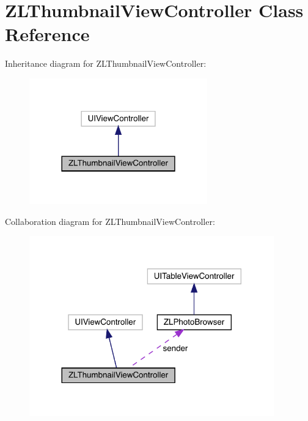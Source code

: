 \hypertarget{interface_z_l_thumbnail_view_controller}{}\section{Z\+L\+Thumbnail\+View\+Controller Class Reference}
\label{interface_z_l_thumbnail_view_controller}


Inheritance diagram for Z\+L\+Thumbnail\+View\+Controller\+:\nopagebreak
\begin{figure}[H]
\begin{center}
\leavevmode
\includegraphics[width=218pt]{interface_z_l_thumbnail_view_controller__inherit__graph}
\end{center}
\end{figure}


Collaboration diagram for Z\+L\+Thumbnail\+View\+Controller\+:\nopagebreak
\begin{figure}[H]
\begin{center}
\leavevmode
\includegraphics[width=300pt]{interface_z_l_thumbnail_view_controller__coll__graph}
\end{center}
\end{figure}
